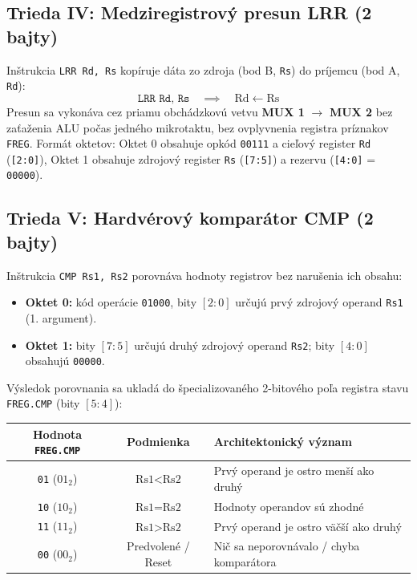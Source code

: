 \documentclass[11pt,a4paper]{article}
\newcommand{\reg}[1]{\texttt{#1}}
\newcommand{\bits}[1]{\texttt{#1}}
\begin{document}
\subsection{Trieda IV: Medziregistrový presun LRR (2 bajty)}
Inštrukcia \texttt{LRR Rd, Rs} kopíruje dáta zo zdroja (bod B, \reg{Rs}) do príjemcu (bod A, \reg{Rd}):
$$\texttt{LRR Rd, Rs} \quad \implies \quad \text{Rd} \leftarrow \text{Rs}$$
Presun sa vykonáva cez priamu obchádzkovú vetvu \textbf{MUX 1} $\to$ \textbf{MUX 2} bez zaťaženia ALU počas jedného mikrotaktu, bez ovplyvnenia registra príznakov \reg{FREG}. Formát oktetov: Oktet 0 obsahuje opkód \bits{00111} a cieľový register \reg{Rd} (\bits{[2:0]}), Oktet 1 obsahuje zdrojový register \reg{Rs} (\bits{[7:5]}) a rezervu (\bits{[4:0]} = \bits{00000}).

\subsection{Trieda V: Hardvérový komparátor CMP (2 bajty)}
Inštrukcia \texttt{CMP Rs1, Rs2} porovnáva hodnoty registrov bez narušenia ich obsahu:
\begin{itemize}
  \item \textbf{Oktet 0:} kód operácie \bits{01000}, bity $[2:0]$ určujú prvý zdrojový operand \reg{Rs1} (1. argument).
  \item \textbf{Oktet 1:} bity $[7:5]$ určujú druhý zdrojový operand \reg{Rs2}; bity $[4:0]$ obsahujú \bits{00000}.
\end{itemize}
Výsledok porovnania sa ukladá do špecializovaného 2-bitového poľa registra stavu \reg{FREG.CMP} (bity $[5:4]$):
\begin{center}
\begin{tabular}{ccl}
\toprule
Hodnota \reg{FREG.CMP} & Podmienka & Architektonický význam \\
\midrule
\texttt{01} ($01_2$) & $\text{Rs1} < \text{Rs2}$ & Prvý operand je ostro menší ako druhý \\
\texttt{10} ($10_2$) & $\text{Rs1} = \text{Rs2}$ & Hodnoty operandov sú zhodné \\
\texttt{11} ($11_2$) & $\text{Rs1} > \text{Rs2}$ & Prvý operand je ostro väčší ako druhý \\
\texttt{00} ($00_2$) & Predvolené / Reset & Nič sa neporovnávalo / chyba komparátora \\
\bottomrule
\end{tabular}
\end{center}
\end{document}
